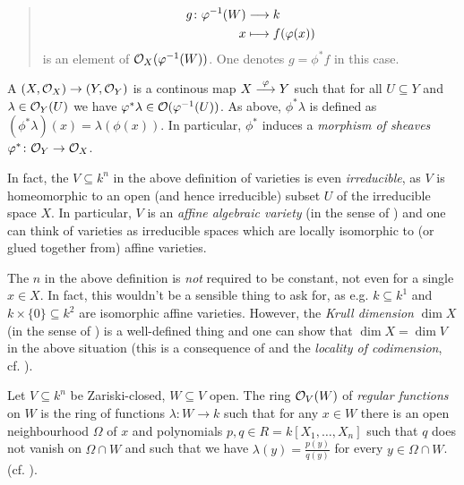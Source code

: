 \documentclass[a4paper,parskip=full,numbers=enddot]{scrreprt}
\begin{document}
\begin{defi}
\begin{defi}
\begin{quote}
        \begin{align*}
            g\colon \phi^{-1}(W) &\longto k\\
            x&\longmapsto f(\phi(x))
        \end{align*}
        is an element of $\Oo_X(\phi^{-1}(W))$. One denotes $g=\phi^*f$ in this case.
    \end{quote}
    A  $(X,\Oo_X) \to (Y,\Oo_Y)$ is a continous map $X\morphism[\phi] Y$ such that for all $U\subseteq Y$ and $\lambda \in \Oo_Y(U)$ we have $\phi^\ast \lambda \in \Oo(\phi^{-1}(U))$. As above, $\phi^\ast\lambda$ is defined as $(\phi^\ast\lambda)(x) = \lambda(\phi(x))$. In particular, $\phi^*$ induces a \emph{morphism of sheaves} $\phi^*\colon \Oo_Y\to\Oo_X$.
\end{defi}
\begin{rem*}
	\begin{alphanumerate}
		\item In fact, the $V\subseteq k^n$ in the above definition of varieties is even \emph{irreducible}, as $V$ is homeomorphic to an open (and hence irreducible) subset $U$ of the irreducible space $X$. In particular, $V$ is an \emph{affine algebraic variety} (in the sense of \cite[Definition~2.2.1]{alg1}) and one can think of varieties as irreducible spaces which are locally isomorphic to (or glued together from) affine varieties.
		\item The $n$ in the above definition is \emph{not} required to be constant, not even for a single $x\in X$. In fact, this wouldn't be a sensible thing to ask for, as e.g. $k\subseteq k^1$ and $k\times\{0\}\subseteq k^2$ are isomorphic affine varieties. However, the \emph{Krull dimension} $\dim X$ (in the sense of \cite[Definition~2.1.4]{alg1}) is a well-defined thing and one can show that $\dim X=\dim V$ in the above situation (this is a consequence of \cite[Theorem~6]{alg1} and the \emph{locality of codimension}, cf. \cite[Remark~2.1.3]{alg1}).
	\end{alphanumerate}
\end{rem*}
\begin{example}
    Let $V\subseteq k^n$ be Zariski-closed, $W\subseteq V$ open. The ring $\Oo_V(W)$ of \emph{regular functions} on $W$ is the ring of functions $\lambda\colon W\to k$ such that for any $x\in W$ there is an open neighbourhood $\Omega$ of $x$ and polynomials $p,q\in R= k[X_1,\ldots,X_n]$ such that $q$ does not vanish on $\Omega\cap W$ and such that we have $\lambda(y) = \frac{p(y)}{q(y)}$ for every $y\in \Omega\cap W$. (cf. \cite[Definition 2.2.2]{alg1}).
     

\end{example}
\end{defi}
\end{document}

